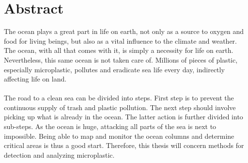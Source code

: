 \chapter*{Abstract}

The ocean plays a great part in life on earth, not only as a source to oxygen and food for living beings, but also as a vital influence to the climate and weather. The ocean, with all that comes with it, is simply a necessity for life on earth. Nevertheless, this same ocean is not taken care of. Millions of pieces of plastic, especially microplastic, pollutes and eradicate sea life every day, indirectly affecting life on land. 
\\\\
The road to a clean sea can be divided into steps. First step is to prevent the continuous supply of trash and plastic pollution. The next step should involve picking up what is already in the ocean. The latter action is further divided into sub-steps. As the ocean is huge, attacking all parts of the sea is next to impossible. Being able to map and monitor the ocean columns and determine critical areas is thus a good start. Therefore, this thesis will concern methods for detection and analyzing microplastic. 
\\\\


\hypersetup{pageanchor=false}